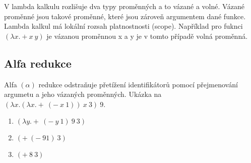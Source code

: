 \documentclass{szzclass}
\begin{document}
V lambda kalkulu rozlišuje dva typy proměnných a to vázané a volné. Vázané proměnné jsou takové proměnné, které jsou zároveň argumentem
dané funkce. Lambda kalkul má lokální rozsah platnostnosti (scope).
Například pro fuknci $(\lambda x . + x\ y)$ je vázanou proměnnou x a y je v tomto případě volná proměnná.

\subsection{Alfa redukce}

Alfa $(\alpha)$ redukce odstraňuje přetížení identifikátorů pomocí přejmenování argumetu a jeho vázaných proměnných.
Ukázka na $(\lambda x . (\lambda x . +\ (-\ x\ 1))\ x\ 3)\ 9$.
\begin{enumerate}
    \item $(\lambda y . +\ (-\ y\ 1)\ 9\ 3)$
    \item $(+\ (-\ 9 1)\ 3)$
    \item $(+\ 8\ 3)$
\end{enumerate}
\end{document}
